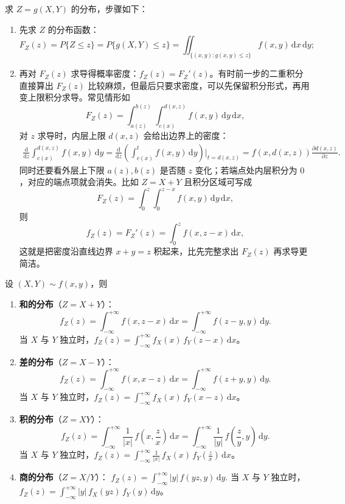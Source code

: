 \documentclass[lang=cn,11pt]{elegantbook}
\begin{document}
\begin{property}[分布函数法]\label{prop:df-method}
求 $Z = g(X,Y)$ 的分布，步骤如下：
\begin{enumerate}
    \item 先求 $Z$ 的分布函数：
    \[
    F_Z(z) = P\{Z \leqslant z\} = P\{g(X,Y) \leqslant z\} = \iint_{\{(x,y): g(x,y) \leqslant z\}}f(x,y)\,\mathrm{d}x\,\mathrm{d}y;
    \]
    \item 再对 $F_Z(z)$ 求导得概率密度：$f_Z(z) = F_Z'(z)$。有时前一步的二重积分直接算出 \(F_Z(z)\) 比较麻烦，但最后只要求密度，可以先保留积分形式，再用变上限积分求导。常见情形如
    \[
    F_Z(z)=\int_{a(z)}^{b(z)}\int_{c(x)}^{d(x,z)}f(x,y)\,\mathrm{d}y\,\mathrm{d}x,
    \]
    对 \(z\) 求导时，内层上限 \(d(x,z)\) 会给出边界上的密度：
    \[
    \begin{aligned}
    \frac{\mathrm{d}}{\mathrm{d}z}\int_{c(x)}^{d(x,z)}f(x,y)\,\mathrm{d}y=\frac{\mathrm{d}}{\mathrm{d}z}
    \left(\int_{c(x)}^t f(x,y)\,\mathrm{d}y\right)\bigg|_{t=d(x,z)}=f(x,d(x,z))\frac{\partial d(x,z)}{\partial z}.
    \end{aligned}
    \]
    同时还要看外层上下限 \(a(z),b(z)\) 是否随 \(z\) 变化；若端点处内层积分为 \(0\)，对应的端点项就会消失。比如 \(Z=X+Y\) 且积分区域可写成
    \[
    F_Z(z)=\int_0^z\int_0^{z-x}f(x,y)\,\mathrm{d}y\,\mathrm{d}x,
    \]
    则
    \[
    f_Z(z)=F_Z'(z)=\int_0^z f(x,z-x)\,\mathrm{d}x,
    \]
    这就是把密度沿直线边界 \(x+y=z\) 积起来，比先完整求出 \(F_Z(z)\) 再求导更简洁。
\end{enumerate}
\end{property}

\begin{property}\label{prop:diff-prod-quot-dist}
设 $(X,Y) \sim f(x,y)$，则
\begin{enumerate}
    \item \textbf{和的分布}（$Z = X + Y$）：
    \[
    f_Z(z) = \int_{-\infty}^{+\infty}f(x, z-x)\,\mathrm{d}x = \int_{-\infty}^{+\infty}f(z-y, y)\,\mathrm{d}y.
    \]
    当 $X$ 与 $Y$ 独立时，$f_Z(z) = \displaystyle\int_{-\infty}^{+\infty}f_X(x)\,f_Y(z-x)\,\mathrm{d}x$。
    \item \textbf{差的分布}（$Z = X - Y$）：
    \[
    f_Z(z) = \int_{-\infty}^{+\infty}f(x, x-z)\,\mathrm{d}x = \int_{-\infty}^{+\infty}f(z+y, y)\,\mathrm{d}y.
    \]
    当 $X$ 与 $Y$ 独立时，$f_Z(z) = \displaystyle\int_{-\infty}^{+\infty}f_X(x)\,f_Y(x-z)\,\mathrm{d}x$。

    \item \textbf{积的分布}（$Z = XY$）：
    \[
    f_Z(z) = \int_{-\infty}^{+\infty}\frac{1}{|x|}\,f\!\left(x, \frac{z}{x}\right)\,\mathrm{d}x = \int_{-\infty}^{+\infty}\frac{1}{|y|}\,f\!\left(\frac{z}{y}, y\right)\,\mathrm{d}y.
    \]
    当 $X$ 与 $Y$ 独立时，$f_Z(z) = \displaystyle\int_{-\infty}^{+\infty}\frac{1}{|x|}\,f_X(x)\,f_Y\!\left(\frac{z}{x}\right)\,\mathrm{d}x$。

    \item \textbf{商的分布}（$Z = X / Y$）：
    \(
    f_Z(z) = \int_{-\infty}^{+\infty}|y|\,f(yz, y)\,\mathrm{d}y.
    \)
    当 $X$ 与 $Y$ 独立时，$f_Z(z) = \displaystyle\int_{-\infty}^{+\infty}|y|\,f_X(yz)\,f_Y(y)\,\mathrm{d}y$。
\end{enumerate}
\end{property}
\end{document}
